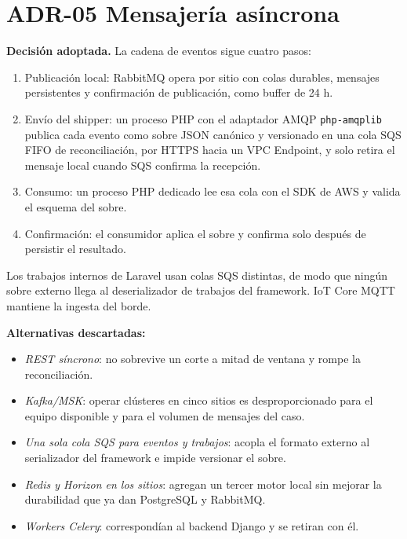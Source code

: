 \section{ADR-05 \textperiodcentered{} Mensajería asíncrona}
\label{sub:adr-05}

\textbf{Decisión adoptada.} La cadena de eventos sigue cuatro pasos:

\begin{enumerate}
  \item Publicación local: RabbitMQ opera por sitio con colas durables, mensajes persistentes y confirmación de publicación, como buffer de 24 h.
  \item Envío del shipper: un proceso PHP con el adaptador AMQP \texttt{php-amqplib} publica cada evento como sobre JSON canónico y versionado en una cola SQS FIFO de reconciliación, por HTTPS hacia un VPC Endpoint, y solo retira el mensaje local cuando SQS confirma la recepción.
  \item Consumo: un proceso PHP dedicado lee esa cola con el SDK de AWS y valida el esquema del sobre.
  \item Confirmación: el consumidor aplica el sobre y confirma solo después de persistir el resultado.
\end{enumerate}

Los trabajos internos de Laravel usan colas SQS distintas, de modo que ningún sobre externo llega al deserializador de trabajos del framework. IoT Core MQTT mantiene la ingesta del borde.

\textbf{Alternativas descartadas:}

\begin{itemize}
  \item \emph{REST síncrono}: no sobrevive un corte a mitad de ventana y rompe la reconciliación.
  \item \emph{Kafka/MSK}: operar clústeres en cinco sitios es desproporcionado para el equipo disponible y para el volumen de mensajes del caso.
  \item \emph{Una sola cola SQS para eventos y trabajos}: acopla el formato externo al serializador del framework e impide versionar el sobre.
  \item \emph{Redis y Horizon en los sitios}: agregan un tercer motor local sin mejorar la durabilidad que ya dan PostgreSQL y RabbitMQ.
  \item \emph{Workers Celery}: correspondían al backend Django y se retiran con él.
\end{itemize}

